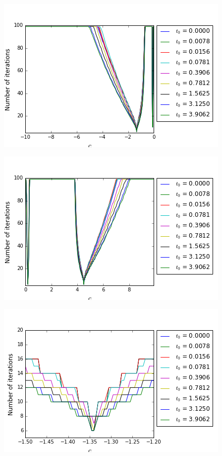 \begingroup
\noindent
\begin{minipage}[t]{.45\linewidth}
	\includegraphics[scale=.4]{figures/FinalFigures/NiterxCoefVarT0FinalVersionN.png}
\end{minipage}
\hfill
\begin{minipage}[t]{.45\linewidth}
	\includegraphics[scale=.4]{figures/FinalFigures/NiterxCoefVarT0FinalVersionP.png}
\end{minipage}
\begin{minipage}[t]{.45\linewidth}
	\includegraphics[scale=.4]{figures/FinalFigures/NiterxCoefVarT0FinalVersionNDetail.png}
\end{minipage}
